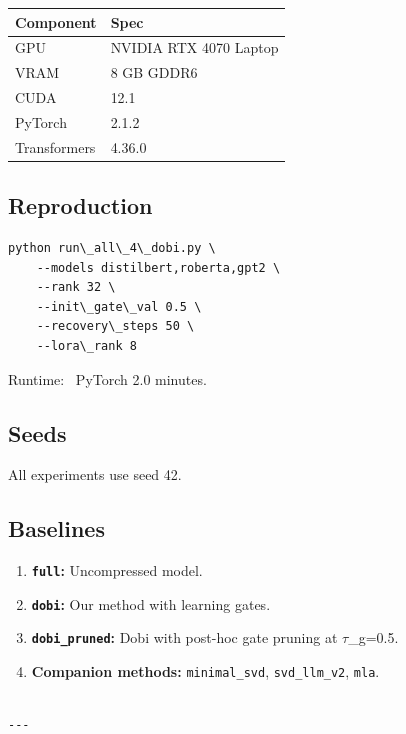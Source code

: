 \begin{table}[H]
\centering
\small
\begin{tabular}{ll}
\toprule
\textbf{Component} & \textbf{Spec} \\
\midrule
GPU & NVIDIA RTX 4070 Laptop \\
VRAM & 8 GB GDDR6 \\
CUDA & 12.1 \\
PyTorch & 2.1.2 \\
Transformers & 4.36.0 \\
\bottomrule
\end{tabular}
\end{table}

\subsection{Reproduction}

\begin{lstlisting}
python run\_all\_4\_dobi.py \
    --models distilbert,roberta,gpt2 \
    --rank 32 \
    --init\_gate\_val 0.5 \
    --recovery\_steps 50 \
    --lora\_rank 8
\end{lstlisting}

Runtime: ~PyTorch 2.0 minutes.

\subsection{Seeds}

All experiments use seed 42.

\subsection{Baselines}

\begin{enumerate}
\item \textbf{\texttt{full}:} Uncompressed model.
\item \textbf{\texttt{dobi}:} Our method with learning gates.
\item \textbf{\texttt{dobi\_pruned}:} Dobi with post-hoc gate pruning at $\tau$\_g=0.5.
\item \textbf{Companion methods:} \texttt{minimal\_svd}, \texttt{svd\_llm\_v2}, \texttt{mla}.
\end{enumerate}
\begin{lstlisting}

---
\end{lstlisting}

